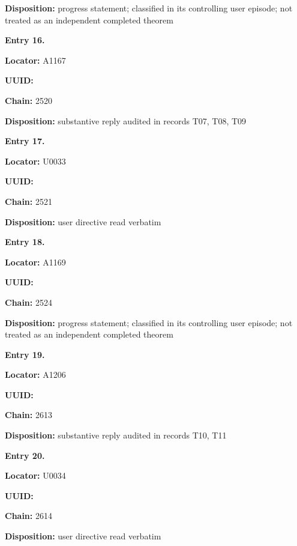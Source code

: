 \textbf{Disposition:} progress statement; classified in its controlling
user episode; not treated as an independent completed theorem


\textbf{Entry 16.}

\textbf{Locator:} A1167

\textbf{UUID:} \protect{}

\textbf{Chain:} 2520

\textbf{Disposition:} substantive reply audited in records T07, T08, T09


\textbf{Entry 17.}

\textbf{Locator:} U0033

\textbf{UUID:} \protect{}

\textbf{Chain:} 2521

\textbf{Disposition:} user directive read verbatim


\textbf{Entry 18.}

\textbf{Locator:} A1169

\textbf{UUID:} \protect{}

\textbf{Chain:} 2524

\textbf{Disposition:} progress statement; classified in its controlling
user episode; not treated as an independent completed theorem


\textbf{Entry 19.}

\textbf{Locator:} A1206

\textbf{UUID:} \protect{}

\textbf{Chain:} 2613

\textbf{Disposition:} substantive reply audited in records T10, T11


\textbf{Entry 20.}

\textbf{Locator:} U0034

\textbf{UUID:} \protect{}

\textbf{Chain:} 2614

\textbf{Disposition:} user directive read verbatim


